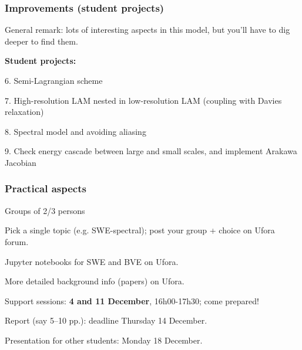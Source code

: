 \documentclass[aspectratio=43,9pt]{beamer}
\begin{document}
%
%
\begin{frame}
	\frametitle{Improvements (student projects)}
	General remark: lots of interesting aspects in this model, but you'll have to dig deeper to find them.
	\par\vspace*{4ex}
	{\bf Student projects:}
	\begin{myitemize}{1ex}
		\item[6.] Semi-Lagrangian scheme
		\item[7.] High-resolution LAM nested in low-resolution LAM (coupling with Davies relaxation)
		\item[8.] Spectral model and avoiding aliasing
		\item[9.] Check energy cascade between large and small scales, and implement Arakawa Jacobian
	\end{myitemize}
\end{frame}
%
%
\begin{frame}
	\frametitle{Practical aspects}
	\begin{myitemize}{2ex}
		\item Groups of 2/3 persons
		\item Pick a single topic (e.g. SWE-spectral); post your group + choice on Ufora forum.
		\item Jupyter notebooks for SWE and BVE on Ufora.
		\item More detailed background info (papers) on Ufora.
		\item Support sessions: \textbf{4 and 11 December}, 16h00-17h30; come prepared!
		\item Report (say 5--10 pp.): deadline Thursday 14 December.
		\item Presentation for other students: Monday 18 December.
	\end{myitemize}
\end{frame}
%
%
\end{document}
